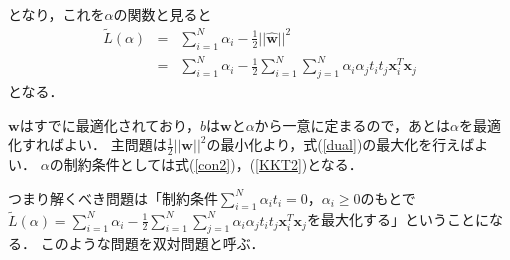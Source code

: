 となり，これを$\alpha$の関数と見ると
\begin{eqnarray}
    \tilde{L}(\alpha)&=&\sum_{i=1}^{N}\alpha_i-\frac{1}{2}||\hat{\bm{w}}||^2\\
    &=&\sum_{i=1}^{N}\alpha_i-\frac{1}{2}\sum_{i=1}^{N}\sum_{j=1}^{N}\alpha_i\alpha_jt_it_j\bm{x}_i^T\bm{x}_j
    \label{dual}
\end{eqnarray}
となる．\par
$\bm{w}$はすでに最適化されており，$b$は$\bm{w}$と$\alpha$から一意に定まるので，あとは$\alpha$を最適化すればよい．
主問題は$\frac{1}{2}||\bm{w}||^2$の最小化より，式(\ref{dual})の最大化を行えばよい．
$\alpha$の制約条件としては式(\ref{con2})，(\ref{KKT2})となる．\par
つまり解くべき問題は「制約条件$\sum_{i=1}^{N}\alpha_it_i=0$，$\alpha_i \geq 0$のもとで$\tilde{L}(\alpha)=\sum_{i=1}^{N}\alpha_i-\frac{1}{2}\sum_{i=1}^{N}\sum_{j=1}^{N}\alpha_i\alpha_jt_it_j\bm{x}_i^T\bm{x}_j$を最大化する」ということになる．
このような問題を双対問題と呼ぶ．
